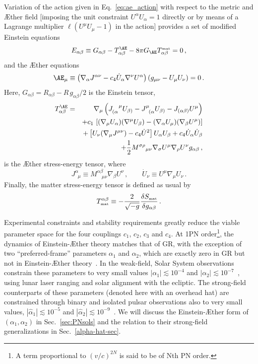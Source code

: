 \documentclass[prd,aps,twocolumn,nofootinbib,showpacs,superscriptaddress]{revtex4-1}
\newcommand\be{\begin{equation}}
\newcommand\ba{\begin{eqnarray}}
\newcommand\ee{\end{equation}}
\newcommand\ea{\end{eqnarray}}
\def\a{\alpha}
\def\b{\beta}
\def\r{\rho}
\def\s{\sigma}
\def\m{\mu}
\def\n{\nu}
\newcommand{\MAT}{{\mbox{\tiny mat}}}
\begin{document}
Variation of the action given in Eq.~\eqref{eq:ae_action} with respect to the metric and \AE ther 
field [imposing the unit constraint $U^{\alpha} U_{\alpha} = 1$
directly or by means of a Lagrange multiplier $\ell (U^\mu
U_\mu-1)$ in the action] provides a set of modified Einstein equations 
\be\label{E_def}
E_{\a\b}\equiv G_{\a\b} - T^{\AE}_{\a\b}-8\pi G_{\AE} T^\MAT_{\a\b}=0\,, 
\ee 
and the \AE ther equations
\be\label{AE_def} \AE_\mu\equiv\left(\nabla_\a
J^{\a\n}-c_4\dot{U}_\a\nabla^\n U^\a\right) \left(g_{\mu\nu}-U_\m
U_\n\right)=0\,.  
\ee 
Here, $G_{\a\b}=R_{\a\b}-R\, g_{\a\b}/2$ is the
Einstein tensor,
\ba\label{Tae}
T^{\AE}_{\a\b}&=&\nabla_\m\left(J^{\phantom{(\a}\m}_{(\a}U_{\b)}-J^\m_{\phantom{\m}(\a}U_{\b)}-J_{(\a\b)}U^\m\right)\nonumber\\ &&+c_1\,\left[
  (\nabla_\m U_\a)(\nabla^\m U_\b)-(\nabla_\a U_\m)(\nabla_\b U^\m)
  \right]\nonumber\\ &&+\left[ U_\n(\nabla_\m J^{\m\n})-c_4 \dot{U}^2
  \right] U_\a U_\b +c_4 \dot{U}_\a \dot{U}_\b\nonumber\\&&+\frac{1}{2} M^{\s\r}{}_{\m\n} \nabla_\s U^\m \nabla_\r U^\n
g_{\a\b}\,,\ea 
is the \AE ther stress-energy tensor,  where
\be
J^\a_{\phantom{a}\m}\equiv
M^{\a\b}_{\phantom{ab}\m\n} \nabla_\b U^\n\,,
\qquad\dot{U}_\n\equiv U^\m\nabla_\m U_\n\,.  
\ee
Finally, the matter
stress-energy tensor is defined as usual by 
\be
\label{eq:emtmatt}
T^{\a\b}_\MAT \equiv-\frac{2}{\sqrt{-g}} \frac{\delta S_{\MAT}}{\delta
  g_{\a\b}}\,.
\ee 

Experimental constraints and stability requirements greatly reduce the
viable parameter space for the four couplings $c_1$, $c_2$, $c_3$ and
$c_4$.  At 1PN order\footnote{A term proportional to $(v/c)^{2N}$ is said to be of Nth PN order.}, 
the dynamics of Einstein-\AE ther theory matches
that of GR, with the exception of two
``preferred-frame'' parameters $\alpha_1$ and $\alpha_2$, which are
exactly zero in GR but not in Einstein-\AE ther
theory~\cite{Foster:2005dk}. In the weak-field, Solar System observations constrain these
parameters to very small values $|\alpha_1|\lesssim 10^{-4}$ and
$|\alpha_2| \lesssim 10^{-7}$~\cite{will-living}, using lunar laser ranging
and solar alignment with the ecliptic. The strong-field counterparts of these parameters
(denoted here with an overhead hat) are constrained through binary and isolated pulsar 
observations also to very small values,
$|\hat{\alpha}_1| \lesssim 10^{-5}$ and
$|\hat{\alpha}_2| \lesssim 10^{-9}$~\cite{Shao:2013wga,Shao:2012eg}. 
We will discuss the Einstein-\AE ther form of $(\alpha_{1},\alpha_{2})$ in Sec.~\ref{sec:PNsols} and the relation to their strong-field
generalizations in Sec.~\ref{alpha-hat-sec}.
\end{document}
